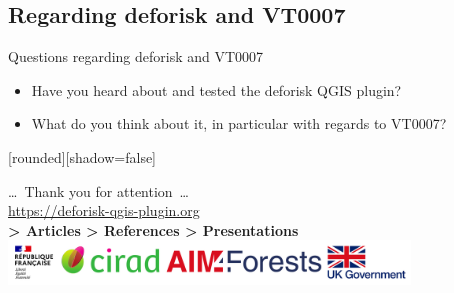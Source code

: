 \documentclass[10pt,table,dvipsnames,compress]{beamer}
\begin{document}
\subsection{Regarding deforisk and VT0007}
\label{sec:org4af7ad5}

\begin{frame}[label={sec:orge3c99a4}]{Questions regarding deforisk and VT0007}
\begin{itemize}
\item Have you heard about and tested the deforisk QGIS plugin?
\item What do you think about it, in particular with regards to VT0007?
\end{itemize}
\end{frame}


{
  [rounded][shadow=false]
  \begin{frame}[plain]
    \begin{block}{}
      \begin{center}
        \ldots~Thank you for attention~\ldots \\
        \url{https://deforisk-qgis-plugin.org} \\
        \textbf{> Articles > References > Presentations} \\
        \includegraphics[width=0.8\textwidth]{figs/partners_logos}
      \end{center}
    \end{block}
  \end{frame}
}
\end{document}

